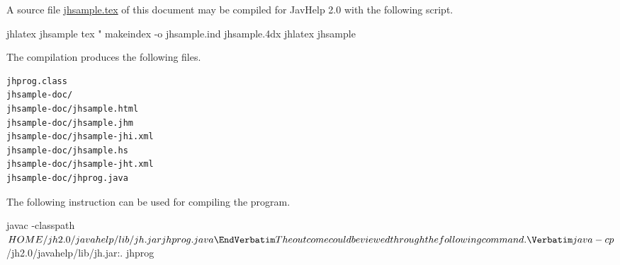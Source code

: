 \documentclass{article}
\begin{document}
A source file \edef\temp{\noexpand\url{jhsample.tex}}\temp{} of this
document  may be compiled for JavHelp 2.0 with the following script.

\Verbatim
jhlatex jhsample
tex "\def\filename{{$1}{idx}{4dx}{ind}} 
makeindex -o jhsample.ind jhsample.4dx
jhlatex jhsample
\EndVerbatim

The compilation produces the following files.

\begin{verbatim}
jhprog.class
jhsample-doc/
jhsample-doc/jhsample.html
jhsample-doc/jhsample.jhm
jhsample-doc/jhsample-jhi.xml
jhsample-doc/jhsample.hs
jhsample-doc/jhsample-jht.xml
jhsample-doc/jhprog.java
\end{verbatim}


The following instruction can be used for compiling the program.

\Verbatim
javac -classpath ${HOME}/jh2.0/javahelp/lib/jh.jar jhprog.java
\EndVerbatim


The outcome could be viewed through the following command.

\Verbatim
java -cp ${\home}/jh2.0/javahelp/lib/jh.jar:. jhprog
\EndVerbatim


\printindex
\end{document}

